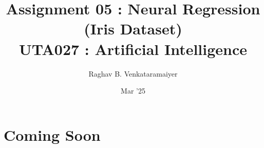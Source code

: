 \documentclass[11pt]{article}
\author{Raghav B. Venkataramaiyer}
\date{Mar '25}
\title{Assignment 05 : Neural Regression (Iris Dataset)\\\medskip
\large UTA027 : Artificial Intelligence}
\begin{document}
\maketitle

\section{Coming Soon}
\label{sec:org98bce68}
\end{document}
